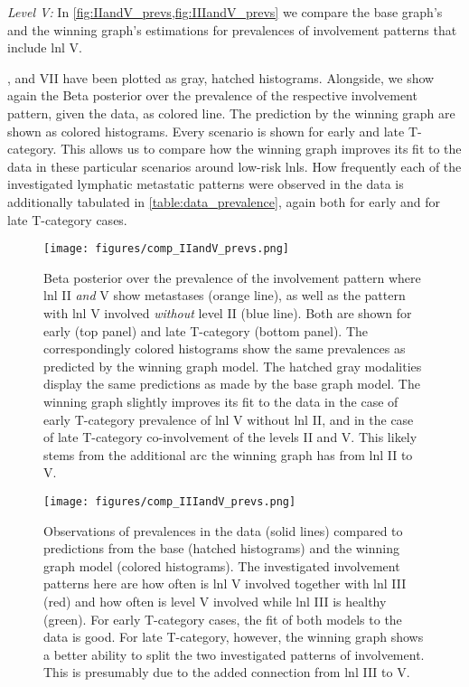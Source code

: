 \documentclass[twocolumn]{aastex631}
\begin{document}
{\it Level V:} In \cref{fig:IIandV_prevs,fig:IIIandV_prevs} we compare the base graph's and the winning graph's estimations for prevalences of involvement patterns that include \gls{lnl} V. 


, and VII have been plotted as gray, hatched histograms. Alongside, we show again the Beta posterior over the prevalence of the respective involvement pattern, given the data, as colored line. The prediction by the winning graph are shown as colored histograms. Every scenario is shown for early and late T-category. This allows us to compare how the winning graph improves its fit to the data in these particular scenarios around low-risk \glspl{lnl}. How frequently each of the investigated lymphatic metastatic patterns were observed in the data is additionally tabulated in \cref{table:data_prevalence}, again both for early and for late T-category cases.

\begin{figure}
    \begin{centering}
        \texttt{[image: figures/comp\_IIandV\_prevs.png]}
        \caption{Beta posterior over the prevalence of the involvement pattern where \gls{lnl} II \emph{and} V show metastases (orange line), as well as the pattern with \gls{lnl} V involved \emph{without} level II (blue line). Both   are shown for early (top panel) and late T-category (bottom panel). The correspondingly colored histograms show the same prevalences as predicted by the winning graph model. The hatched gray modalities display the same predictions as made by the base graph model. The winning graph slightly improves its fit to the data in the case of early T-category prevalence of \gls{lnl} V without \gls{lnl} II, and in the case of late T-category co-involvement of the levels II and V. This likely stems from the additional arc the winning graph has from \gls{lnl} II to V.}
        \label{fig:IIandV_prevs}
    \end{centering}
\end{figure}

\begin{figure}
    \begin{centering}
        \texttt{[image: figures/comp\_IIIandV\_prevs.png]}
        \caption{Observations of prevalences in the data (solid lines) compared to predictions from the base (hatched histograms) and the winning graph model (colored histograms). The investigated involvement patterns here are how often is \gls{lnl} V involved together with \gls{lnl} III (red) and how often is level V involved while \gls{lnl} III is healthy (green). For early T-category cases, the fit of both models to the data is good. For late T-category, however, the winning graph shows a better ability to split the two investigated patterns of involvement. This is presumably due to the added connection from \gls{lnl} III to V.}
        \label{fig:IIIandV_prevs}
    \end{centering}
\end{figure}
\end{document}
